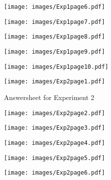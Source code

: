\begin{figure}[htbp]
	\centering
		\texttt{[image: images/Exp1page6.pdf]}
	\label{x1p6}
\end{figure}

\begin{figure}[htbp]
	\centering
		\texttt{[image: images/Exp1page7.pdf]}
	\label{x1p7}
\end{figure}

\begin{figure}[htbp]
	\centering
		\texttt{[image: images/Exp1page8.pdf]}
		\label{x1p8}
\end{figure}

\begin{figure}[htbp]
	\centering
		\texttt{[image: images/Exp1page9.pdf]}
		\label{x1p9}
\end{figure}

\begin{figure}[htbp]
	\centering
		\texttt{[image: images/Exp1page10.pdf]}
		\label{x1p10}
\end{figure}


\clearpage
\begin{figure}[htbp]
	\centering
		\texttt{[image: images/Exp2page1.pdf]}
		\caption{Answersheet for Experiment 2}
		\label{x2p1}
\end{figure}

\begin{figure}
	\centering
		\texttt{[image: images/Exp2page2.pdf]}
			\label{x2p2}
\end{figure}

\begin{figure}
	\centering
		\texttt{[image: images/Exp2page3.pdf]}
			\label{x2p3}
\end{figure}

\begin{figure}
	\centering
		\texttt{[image: images/Exp2page4.pdf]}
			\label{x2p4}
\end{figure}

\begin{figure}
	\centering
		\texttt{[image: images/Exp2page5.pdf]}
			\label{x2p5}
\end{figure}

\begin{figure}
	\centering
		\texttt{[image: images/Exp2page6.pdf]}
			\label{x2p6}
\end{figure}

